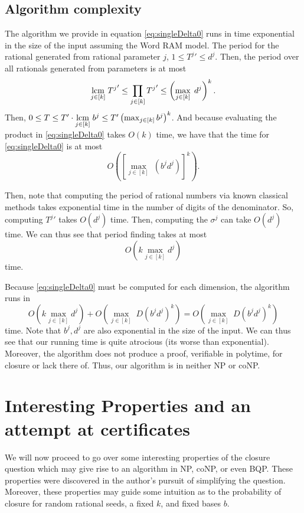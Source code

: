 \documentclass[11pt,titlepage]{article}
\newcommand{\rationalPeriod}{{T^j}'}
\newcommand{\rationalPeriodTotal}{{T}'}
\newcommand{\totalPeriod}{T}
\newcommand{\digSumPeriodic}{\sigma^j}
\begin{document}
\subsection{Algorithm complexity}
The algorithm we provide in equation \eqref{eq:singleDelta0} runs in time exponential 
in the size of the input assuming the Word RAM model. 
The period for the rational generated from rational parameter $j$, $1 \leq \rationalPeriod \leq d^j$. Then,
the period over all rationals generated from parameters is at most 
$$
  \lcm{j \in [k]} \rationalPeriod \leq \prod_{j \in [k]} \rationalPeriod \leq \left(\max_{j \in [k]} \; d^j \right)^k.
$$
Then, 
$0 \leq \totalPeriod \leq \rationalPeriodTotal \cdot \lcm{j \in [k]} b^j \leq \rationalPeriodTotal \left(\max_{j \in [k]} b^j\right)^k$.
And because evaluating the product in \eqref{eq:singleDelta0} takes $O(k)$ time,
we have that the time for \eqref{eq:singleDelta0} is at most
$$
  O\left(\left[\max_{j \in [k]} \; (b^j d^j)\right]^k \right).
$$

Then, note that computing the period of rational numbers via known classical methods takes 
exponential time in the number of digits of the denominator. So, computing
$\rationalPeriod$ takes $O(d^j)$ time. Then, computing the $\digSumPeriodic$
can take $O(d^j)$ time. 
We can thus see that period finding takes at most
$$
O\left(k \max_{j \in [k]} d^j \right)
$$
time.

Because \eqref{eq:singleDelta0} must be computed for each dimension, the algorithm
runs in 
$$
  O\left(k \max_{j \in [k]} d^j \right) + 
  O\left(\max_{j \in [k]} \; D (b^j d^j)^k \right) = 
  O\left(\max_{j \in [k]} \; D (b^j d^j)^k \right)
$$
time.
Note that $b^j, d^j$ are also exponential in the size of the input. 
We can thus see that our running time is quite atrocious (its worse than exponential).
Moreover, the algorithm does not produce a proof, verifiable in polytime, for closure 
or lack there of. Thus, our algorithm is in neither NP or coNP.

\section{Interesting Properties and an attempt at certificates}
We will now proceed to go over some interesting properties of the closure question
which may give rise to an algorithm in NP, coNP, or even BQP. These properties were discovered
in the author's pursuit of simplifying the question. Moreover, these properties may guide
some intuition as to the probability of closure for random rational seeds, a fixed $k$, 
and fixed bases $b$.
\end{document}
